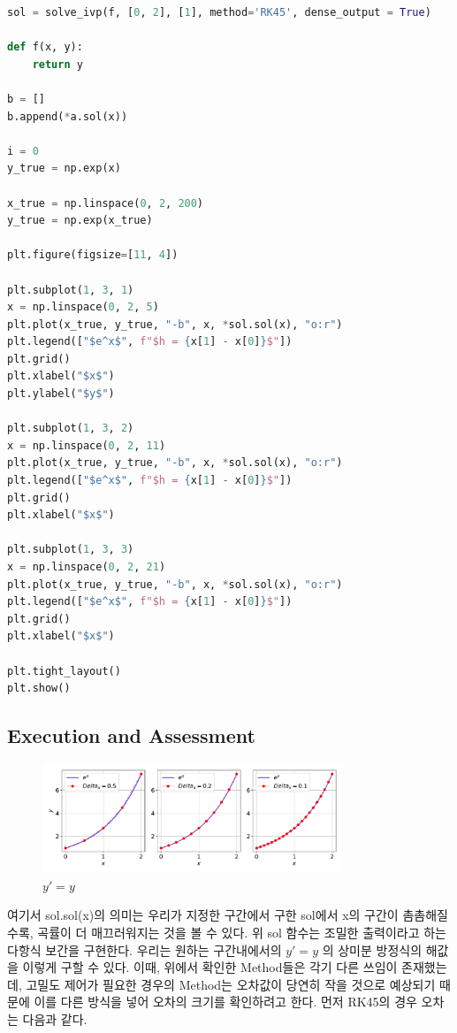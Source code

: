 \documentclass[11pt]{article}
\begin{document}
\begin{lstlisting}[language=Python]
sol = solve_ivp(f, [0, 2], [1], method='RK45', dense_output = True)

def f(x, y):
    return y

b = []
b.append(*a.sol(x))

i = 0
y_true = np.exp(x)

x_true = np.linspace(0, 2, 200)
y_true = np.exp(x_true)

plt.figure(figsize=[11, 4])

plt.subplot(1, 3, 1)
x = np.linspace(0, 2, 5)
plt.plot(x_true, y_true, "-b", x, *sol.sol(x), "o:r")
plt.legend(["$e^x$", f"$h = {x[1] - x[0]}$"])
plt.grid()
plt.xlabel("$x$")
plt.ylabel("$y$")

plt.subplot(1, 3, 2)
x = np.linspace(0, 2, 11)
plt.plot(x_true, y_true, "-b", x, *sol.sol(x), "o:r")
plt.legend(["$e^x$", f"$h = {x[1] - x[0]}$"])
plt.grid()
plt.xlabel("$x$")

plt.subplot(1, 3, 3)
x = np.linspace(0, 2, 21)
plt.plot(x_true, y_true, "-b", x, *sol.sol(x), "o:r")
plt.legend(["$e^x$", f"$h = {x[1] - x[0]}$"])
plt.grid()
plt.xlabel("$x$")

plt.tight_layout()
plt.show()
\end{lstlisting}


\subsection{Execution and Assessment}
\begin{figure}[!ht]
  \centering
  \includegraphics[width=0.8\textwidth]{y=ygraph.pdf}
  \caption{$y' = y$ }
\end{figure}

여기서 sol.sol(x)의 의미는 우리가 지정한 구간에서 구한 sol에서
x의 구간이 촘촘해질수록, 곡률이 더 매끄러워지는 것을 볼 수 있다. 위 sol 함수는 조밀한 출력이라고 하는 다항식 보간을 구현한다. 우리는 원하는 구간내에서의 $y' = y$ 의 상미분 방정식의 해값을 이렇게 구할 수 있다. 이때, 위에서 확인한 Method들은 각기 다른 쓰임이 존재했는데, 고밀도 제어가 필요한 경우의 Method는 오차값이 당연히 작을 것으로 예상되기 때문에 이를 다른 방식을 넣어 오차의 크기를 확인하려고 한다. 먼저 RK45의 경우 오차는 다음과 같다. 
\end{document}
